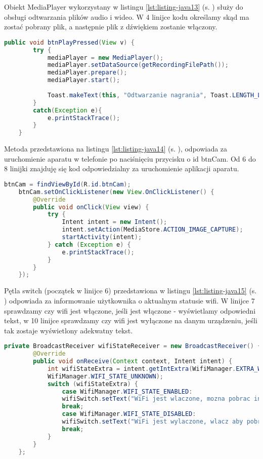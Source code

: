 Obiekt MediaPlayer wykorzystany w listingu \ref{lst:listing-java13} (s. \pageref{lst:listing-java13}) służy do obsługi odtwarzania plików audio i wideo. W 4 linijce kodu określamy skąd ma zostać pobrany plik, a następnie plik z dźwiękiem zostanie włączony.
\begin{lstlisting}[caption=Mikrofon - Odtworzenie nagrania, label={lst:listing-java13}, language=Java]
	public void btnPlayPressed(View v) {
		try {
			mediaPlayer = new MediaPlayer();
			mediaPlayer.setDataSource(getRecordingFilePath());
			mediaPlayer.prepare();
			mediaPlayer.start();
				
			Toast.makeText(this, "Odtwarzanie nagrania", Toast.LENGTH_LONG).show();
		}
		catch(Exception e){
			e.printStackTrace();
		}
	}
\end{lstlisting}

\newpage

Metoda przedstawiona na listingu \ref{lst:listing-java14} (s. \pageref{lst:listing-java14}), odpowiada za uruchomienie aparatu w telefonie po naciśnięciu przycisku o id btnCam. Od 6 do 8 linijki znajduję się kod odpowiedzialny za uruchomienie aplikacji aparatu.
\begin{lstlisting}[caption=Aparat - Włączenie aparatu, label={lst:listing-java14}, language=Java]
	btnCam = findViewById(R.id.btnCam);
	btnCam.setOnClickListener(new View.OnClickListener() {
		@Override
		public void onClick(View view) {
			try {
				Intent intent = new Intent();
				intent.setAction(MediaStore.ACTION_IMAGE_CAPTURE);
				startActivity(intent);
			} catch (Exception e) {
				e.printStackTrace();
			}
		}
	});
\end{lstlisting}

Pętla switch (początek w linijce 6) przedstawiona w listingu \ref{lst:listing-java15} (s. \pageref{lst:listing-java15}) odpowiada za informowanie użytkownika o aktualnym statusie wifi. W linijce 7 sprawdzamy czy wifi jest włączone, jeśli jest włączone - wyświetlamy odpowiedni tekst, w 10 linijce sprawdzamy czy wifi jest wyłączone na danym urządzeniu, jeśli tak zostaje wyświetlony adekwatny tekst.
\begin{lstlisting}[caption=Wifi - Sprawdzenie statusu Wifi, label={lst:listing-java15}, language=Java]
	private BroadcastReceiver wifiStateReceiver = new BroadcastReceiver() {
		@Override
		public void onReceive(Context context, Intent intent) {
			int wifiStateExtra = intent.getIntExtra(WifiManager.EXTRA_WIFI_STATE,
			WifiManager.WIFI_STATE_UNKNOWN);
			switch (wifiStateExtra) {
				case WifiManager.WIFI_STATE_ENABLED:
				wifiSwitch.setText("WiFi jest wlaczone, mozna pobrac informacje");
				break;
				case WifiManager.WIFI_STATE_DISABLED:
				wifiSwitch.setText("WiFi jest wylaczone, wlacz aby pobrac informacje");
				break;
			}
		}
	};
\end{lstlisting}

